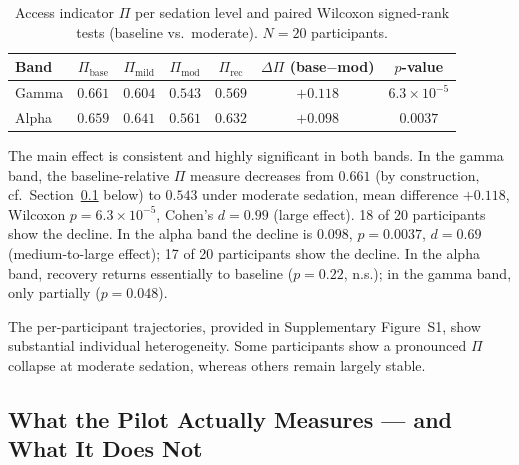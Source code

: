 ﻿\documentclass[11pt,a4paper]{article}
\theoremstyle{plain}
\theoremstyle{definition}
\theoremstyle{remark}
\begin{document}
\begin{table}[h]
\centering
\caption{Access indicator $\Pi$ per sedation level and paired Wilcoxon signed-rank tests (baseline vs.~moderate). $N = 20$ participants.}
\label{tab:pilot-results}
\small
\begin{tabular}{lcccccc}
\hline
Band & $\Pi_{\mathrm{base}}$ & $\Pi_{\mathrm{mild}}$ & $\Pi_{\mathrm{mod}}$ & $\Pi_{\mathrm{rec}}$ & $\Delta\Pi$ (base$-$mod) & $p$-value \\
\hline
Gamma & $0.661$ & $0.604$ & $0.543$ & $0.569$ & $+0.118$ & $6.3 \times 10^{-5}$ \\
Alpha & $0.659$ & $0.641$ & $0.561$ & $0.632$ & $+0.098$ & $0.0037$ \\
\hline
\end{tabular}
\end{table}

The main effect is consistent and highly significant in both bands. In the gamma band, the baseline-relative $\Pi$ measure decreases from $0.661$ (by construction, cf.\ Section~\ref{sec:pilot-framing} below) to $0.543$ under moderate sedation, mean difference $+0.118$, Wilcoxon $p = 6.3 \times 10^{-5}$, Cohen's $d = 0.99$ (large effect). 18 of 20 participants show the decline. In the alpha band the decline is $0.098$, $p = 0.0037$, $d = 0.69$ (medium-to-large effect); 17 of 20 participants show the decline. In the alpha band, recovery returns essentially to baseline ($p = 0.22$, n.s.); in the gamma band, only partially ($p = 0.048$).

The per-participant trajectories, provided in Supplementary Figure~S1, show substantial individual heterogeneity. Some participants show a pronounced $\Pi$ collapse at moderate sedation, whereas others remain largely stable.

\subsection{What the Pilot Actually Measures --- and What It Does Not}
\label{sec:pilot-framing}
\end{document}
